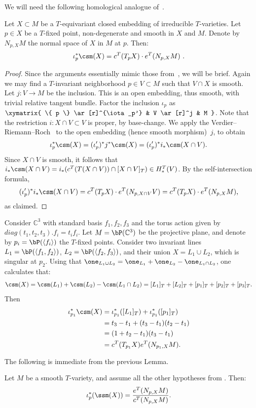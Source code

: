 We will need the following homological analogue of~\cite[Lemma 9.3]{AMSS:motivic}.
\begin{lemma}\label{lemma:locssm} Let $X \subset M$ be a $T$-equivariant closed embedding of 
	irreducible $T$-varieties. Let $p \in X$ be a $T$-fixed point, non-degenerate and smooth in $X$ and $M$.
	Denote by $N_{p,X} M$ the normal space
	of $X$ in $M$ at $p$. Then:
	\[ \iota^*_p \csm(X) = c^T(T_pX) \cdot e^T(N_{p,X} M)~\/. \] 
\end{lemma}
\begin{proof} Since the arguments essentially mimic those from~\cite{AMSS:motivic},
	we will be brief. Again we may find a $T$-invariant neighborhood $p \in V \subset M$ such that $V \cap X$ is smooth.
	Let $j:V \to M$ be the inclusion. This is an open embedding, thus smooth, with trivial relative tangent bundle. Factor the inclusion $\iota_p$ as 
	$\xymatrix{ \{ p \} \ar[r]^{\iota_p'} & V \ar[r]^j & M }$. Note that the restriction $i: X \cap V \subset V$ is proper, by base-change.  
	We apply the Verdier--Riemann--Roch~\cite[Theorem 4.1]{ohmoto:eqcsm} to the open embedding
	(hence smooth morphism)~$j$, to obtain
	\[ \iota_p^* \csm(X) = (\iota'_p)^* j^* \csm(X) = (\iota'_p)^* i_*\csm(X \cap V) \/. \]
	Since $X \cap V$ is smooth, it follows that $i_*\csm(X \cap V) = i_* (c^T (T({X \cap V})) \cap [X \cap V]_T) \in H_*^T(V)$.
	By the self-intersection formula,
	\[ (\iota'_p)^* i_*\csm(X \cap V) = c^T (T_{p}X) \cdot e^T(N_{p,X \cap V}V) = c^T (T_{p}X) \cdot e^T(N_{p,X}M ) \/, \]
	as claimed.\end{proof}
\begin{example} Consider $\mathbb{C}^3$ with standard basis $f_1, f_2, f_3$ and the torus action
		given by $diag(t_1, t_2,t_3).f_i = t_if_i$. Let
		$M= \bP(\mathbb{C}^3)$ be the projective plane, and denote by 
		$p_i= \bP(\langle f_i \rangle)$ the $T$-fixed points. 
		Consider two invariant lines $L_1 = \bP(\langle f_1, f_2 \rangle)$, 
		$L_2 = \bP(\langle f_2, f_3 \rangle)$, and their union $X= L_1 \cup L_2$, which is singular at $p_2$. 
		Using that $\one_{L_1 \cup L_2} = \one_{L_1} + \one_{L_2} - \one_{L_1 \cap L_2}$, 
		one calculates that:
		\[ \csm(X) = \csm(L_1) + \csm(L_2) - \csm(L_1 \cap L_2) = [L_1]_T+ [L_2]_T + [p_1]_T + [p_2]_T + [p_3]_T \/. \]
		Then
		\[ \begin{split} \iota^*_{p_1} \csm(X)  & =  \iota^*_{p_1} ([L_1]_T) + \iota^*_{p_1} ([p_1]_T) \\
			& = t_3-t_1 + (t_3-t_1)(t_2-t_1) \\
			& = (1+ t_2-t_1)(t_3-t_1) \\
			&= c^T(T_{p_1} X) e^T(N_{p_1, X} M) \/. \end{split}\]
	\end{example}
The following is immediate from the previous Lemma.
\begin{corol}\label{cor:issm} Let $M$ be a smooth $T$-variety, and assume all the other hypotheses from . Then:
	\[ \iota_p^*(\ssm(X)) = \frac{e^T(N_{p,X} M)}{c^T(N_{p,X} M)} \/. \]
\end{corol}


